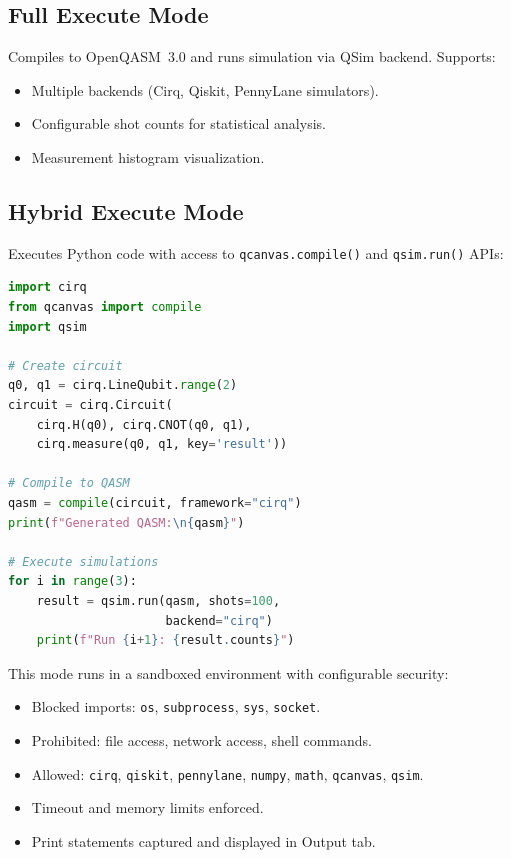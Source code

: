 \documentclass[conference]{IEEEtran}
\begin{document}
\subsection{Full Execute Mode}
Compiles to OpenQASM~3.0 and runs simulation via QSim backend. Supports:
\begin{itemize}
    \item Multiple backends (Cirq, Qiskit, PennyLane simulators).
    \item Configurable shot counts for statistical analysis.
    \item Measurement histogram visualization.
\end{itemize}

\subsection{Hybrid Execute Mode}
Executes Python code with access to \texttt{qcanvas.compile()} and \texttt{qsim.run()} APIs:

\begin{lstlisting}[language=Python, caption={Hybrid execution example}]
import cirq
from qcanvas import compile
import qsim

# Create circuit
q0, q1 = cirq.LineQubit.range(2)
circuit = cirq.Circuit(
    cirq.H(q0), cirq.CNOT(q0, q1),
    cirq.measure(q0, q1, key='result'))

# Compile to QASM
qasm = compile(circuit, framework="cirq")
print(f"Generated QASM:\n{qasm}")

# Execute simulations
for i in range(3):
    result = qsim.run(qasm, shots=100,
                      backend="cirq")
    print(f"Run {i+1}: {result.counts}")
\end{lstlisting}

This mode runs in a sandboxed environment with configurable security:
\begin{itemize}
    \item Blocked imports: \texttt{os}, \texttt{subprocess}, \texttt{sys}, \texttt{socket}.
    \item Prohibited: file access, network access, shell commands.
    \item Allowed: \texttt{cirq}, \texttt{qiskit}, \texttt{pennylane}, \texttt{numpy}, \texttt{math}, \texttt{qcanvas}, \texttt{qsim}.
    \item Timeout and memory limits enforced.
    \item Print statements captured and displayed in Output tab.
\end{itemize}
\end{document}
